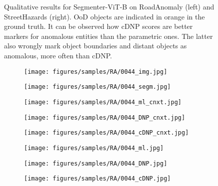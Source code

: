 \documentclass[10pt,twocolumn,letterpaper]{article}
\begin{document}
\begin{figure*}[h!]
\caption{
    Qualitative results for Segmenter-ViT-B on RoadAnomaly (left) and StreetHazards (right). OoD objects are indicated in orange in the ground truth. It can be observed how cDNP scores are better markers for anomalous entities than the parametric ones. The latter also wrongly mark object boundaries and distant objects as anomalous, more often than cDNP.
}
    \label{fig:quali_ra_sh}
\end{figure*} \begin{figure*}[h!]
    \centering
    \begin{subfigure}[b]{0.11\textwidth}
        \centering
        \texttt{[image: figures/samples/RA/0044\_img.jpg]}
    \end{subfigure}
    \begin{subfigure}[b]{0.11\textwidth}
        \centering
        \texttt{[image: figures/samples/RA/0044\_segm.jpg]}
    \end{subfigure}
    \hspace{3px}
    \begin{subfigure}[b]{0.11\textwidth}
        \centering
        \texttt{[image: figures/samples/RA/0044\_ml\_cnxt.jpg]}
    \end{subfigure}
    \begin{subfigure}[b]{0.11\textwidth}
        \centering
        \texttt{[image: figures/samples/RA/0044\_DNP\_cnxt.jpg]}
    \end{subfigure}
    \begin{subfigure}[b]{0.11\textwidth}
        \centering
        \texttt{[image: figures/samples/RA/0044\_cDNP\_cnxt.jpg]}
    \end{subfigure}
    \hspace{3px}
    \begin{subfigure}[b]{0.11\textwidth}
        \centering
        \texttt{[image: figures/samples/RA/0044\_ml.jpg]}
    \end{subfigure}
    \begin{subfigure}[b]{0.11\textwidth}
        \centering
        \texttt{[image: figures/samples/RA/0044\_DNP.jpg]}
    \end{subfigure}
    \begin{subfigure}[b]{0.11\textwidth}
        \centering
        \texttt{[image: figures/samples/RA/0044\_cDNP.jpg]}
    \end{subfigure}
    



\end{figure*}
\end{document}
